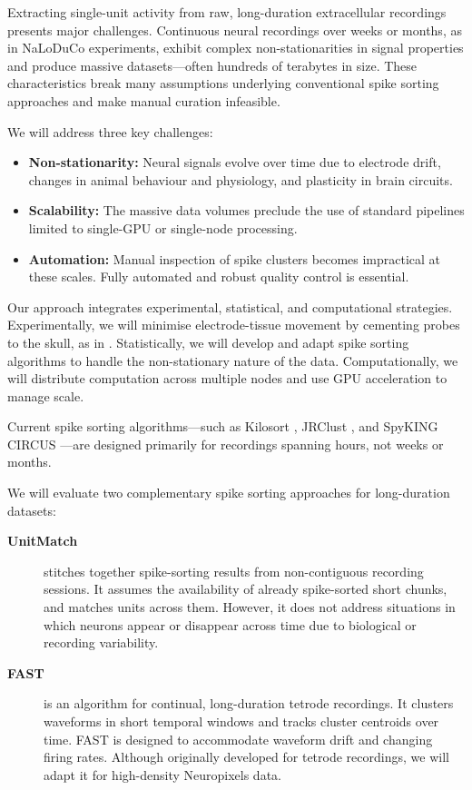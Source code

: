 Extracting single-unit activity from raw, long-duration extracellular
recordings presents major challenges. Continuous neural recordings over weeks
or months, as in NaLoDuCo experiments, exhibit complex non-stationarities in
signal properties and produce massive datasets—often hundreds of terabytes in
size. These characteristics break many assumptions underlying conventional
spike sorting approaches and make manual curation infeasible.

We will address three key challenges:

\begin{itemize}
    \item \textbf{Non-stationarity:} Neural signals evolve over time due to electrode drift, changes in animal behaviour and physiology, and plasticity in brain circuits.
    \item \textbf{Scalability:} The massive data volumes preclude the use of standard pipelines limited to single-GPU or single-node processing.
    \item \textbf{Automation:} Manual inspection of spike clusters becomes impractical at these scales. Fully automated and robust quality control is essential.
\end{itemize}

Our approach integrates experimental, statistical, and computational strategies. Experimentally, we will minimise electrode-tissue movement by cementing probes to the skull, as in \citep{schoonoverEtAl21}. Statistically, we will develop and adapt spike sorting algorithms to handle the non-stationary nature of the data. Computationally, we will distribute computation across multiple nodes and use GPU acceleration to manage scale.

\label{sec:offlineMethodsNonStationarity}

Current spike sorting algorithms—such as Kilosort \citep{pachitariuEtAl24}, JRClust \citep{chungEtAl17}, and SpyKING CIRCUS \citep{ygerEtAl18}—are designed primarily for recordings spanning hours, not weeks or months.

We will evaluate two complementary spike sorting approaches for long-duration datasets:

\begin{description}
    \item[\textbf{UnitMatch}] \citep{vanBeestEtAl24} stitches together spike-sorting results from non-contiguous recording sessions. It assumes the availability of already spike-sorted short chunks, and matches units across them. However, it does not address situations in which neurons appear or disappear across time due to biological or recording variability.
    
    \item[\textbf{FAST}] \citep{dhawaleEtAl17} is an algorithm for continual, long-duration tetrode recordings. It clusters waveforms in short temporal windows and tracks cluster centroids over time. FAST is designed to accommodate waveform drift and changing firing rates. Although originally developed for tetrode recordings, we will adapt it for high-density Neuropixels data.
\end{description}

